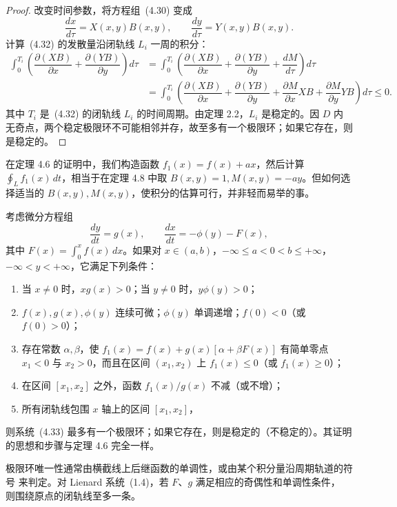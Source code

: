 \begin{proof}
改变时间参数，将方程组~(4.30) 变成
\[
\dfrac{dx}{d\tau}=X(x,y)B(x,y),\qquad
\dfrac{dy}{d\tau}=Y(x,y)B(x,y). \tag{4.32}
\]
计算~(4.32) 的发散量沿闭轨线 $L_i$ 一周的积分：
\[
\begin{aligned}
\int_0^{T_i}\left(\dfrac{\partial(XB)}{\partial x}+\dfrac{\partial(YB)}{\partial y}\right)d\tau
&=\int_0^{T_i}\left(\dfrac{\partial(XB)}{\partial x}+\dfrac{\partial(YB)}{\partial y}+\dfrac{dM}{d\tau}\right)d\tau\\
&=\int_0^{T_i}\left(\dfrac{\partial(XB)}{\partial x}+\dfrac{\partial(YB)}{\partial y}+\dfrac{\partial M}{\partial x}XB+\dfrac{\partial M}{\partial y}YB\right)d\tau\leq0.
\end{aligned}
\]
其中 $T_i$ 是~(4.32) 的闭轨线 $L_i$ 的时间周期。由定理 2.2，$L_i$ 是稳定的。因 $D$ 内无奇点，两个稳定极限环不可能相邻并存，故至多有一个极限环；如果它存在，则是稳定的。
\end{proof}

在定理 4.6 的证明中，我们构造函数 $f_1(x)=f(x)+ax$，然后计算 $\oint_Lf_1(x)\,dt$，相当于在定理 4.8 中取 $B(x,y)=1,M(x,y)=-ay$。但如何选择适当的 $B(x,y),M(x,y)$，使积分的估算可行，并非轻而易举的事。

\begin{theorem}{}{ }
考虑微分方程组
\[
\dfrac{dy}{dt}=g(x),\qquad \dfrac{dx}{dt}=-\phi(y)-F(x), \tag{4.33}
\]
其中 $F(x)=\displaystyle\int_0^xf(x)\,dx$。如果对 $x\in(a,b)$，$-\infty\leq a<0<b\leq+\infty$，$-\infty<y<+\infty$，它满足下列条件：
\begin{enumerate}
\item 当 $x\ne0$ 时，$xg(x)>0$；当 $y\ne0$ 时，$y\phi(y)>0$；
\item $f(x),g(x),\phi(y)$ 连续可微；$\phi(y)$ 单调递增；$f(0)<0$（或 $f(0)>0$）；
\item 存在常数 $\alpha,\beta$，使 $f_1(x)=f(x)+g(x)[\alpha+\beta F(x)]$ 有简单零点 $x_1<0$ 与 $x_2>0$，而且在区间 $(x_1,x_2)$ 上 $f_1(x)\leq0$（或 $f_1(x)\geq0$）；
\item 在区间 $[x_1,x_2]$ 之外，函数 $f_1(x)/g(x)$ 不减（或不增）；
\item 所有闭轨线包围 $x$ 轴上的区间 $[x_1,x_2]$，
\end{enumerate}
则系统~(4.33) 最多有一个极限环；如果它存在，则是稳定的（不稳定的）。其证明的思想和步骤与定理 4.6 完全一样。
\end{theorem}

\iffalse
极限环唯一性通常由横截线上后继函数的单调性，或由某个积分量沿周期轨道的符号
来判定。对 Lienard 系统~(1.4)，若 $F$、$g$ 满足相应的奇偶性和单调性条件，
则围绕原点的闭轨线至多一条。

